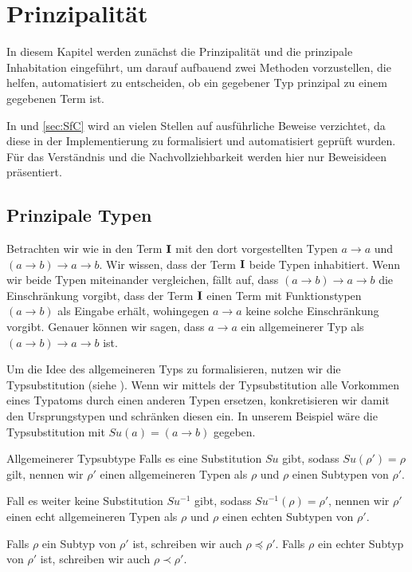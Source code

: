\chapter{Prinzipalität}
\label{ch:princ}
In diesem Kapitel werden zunächst die Prinzipalität und die prinzipale Inhabitation eingeführt, um darauf aufbauend zwei Methoden vorzustellen, die helfen, automatisiert zu entscheiden, ob ein gegebener Typ prinzipal zu einem gegebenen Term ist. 

In  und \ref{sec:SfC} wird an vielen Stellen auf ausführliche Beweise verzichtet, da diese in der Implementierung zu  formalisiert und automatisiert geprüft wurden. Für das Verständnis und die Nachvollziehbarkeit werden hier nur Beweisideen präsentiert.

\section{Prinzipale Typen}
Betrachten wir wie in  den Term $\textbf{I}$ mit den dort vorgestellten Typen $a\to a$ und $(a\to b)\to a\to b$. Wir wissen, dass der Term $\textbf{I}$ beide Typen inhabitiert. Wenn wir beide Typen miteinander vergleichen, fällt auf, dass $(a \to b)\to a \to b$ die Einschränkung vorgibt, dass der Term $\textbf{I}$ einen Term mit Funktionstypen $(a\to b)$ als Eingabe erhält, wohingegen $a \to a$ keine solche Einschränkung vorgibt. Genauer können wir sagen, dass $a \to a$ ein allgemeinerer Typ als $(a \to b)\to a \to b$ ist.

Um die Idee des allgemeineren Typs zu formalisieren, nutzen wir die Typsubstitution (siehe ). Wenn wir mittels der Typsubstitution alle Vorkommen eines Typatoms durch einen anderen Typen ersetzen, konkretisieren wir damit den Ursprungstypen und schränken diesen ein. In unserem Beispiel wäre die Typsubstitution mit $Su(a)=(a\to b)$ gegeben.

\begin{definition}{Allgemeinerer Typ}{subtype}
    Falls es eine Substitution $Su$ gibt, sodass $Su(\rho')=\rho$ gilt, nennen wir $\rho'$ einen allgemeineren Typen als $\rho$ und $\rho$ einen Subtypen von $\rho'$.
    
    Fall es weiter keine Substitution $Su^{-1}$ gibt, sodass $Su^{-1}(\rho)=\rho'$, nennen wir $\rho'$ einen echt allgemeineren Typen als $\rho$ und $\rho$ einen echten Subtypen von $\rho'$.
\end{definition}

\begin{notation}
    Falls $\rho$ ein Subtyp von $\rho'$ ist, schreiben wir auch $\rho\preceq\rho'$. Falls $\rho$ ein echter Subtyp von $\rho'$ ist, schreiben wir auch $\rho\prec\rho'$.
\end{notation}

